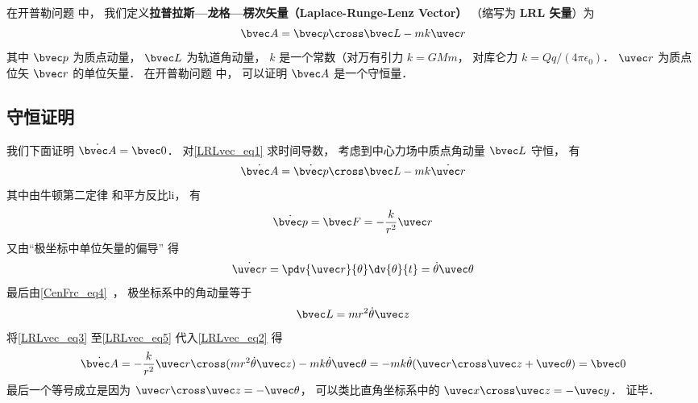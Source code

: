 

在开普勒问题%
中， 我们定义\textbf{拉普拉斯—龙格—楞次矢量（Laplace-Runge-Lenz Vector）} （缩写为 \textbf{LRL 矢量}）为
\begin{equation}\label{LRLvec_eq1}
\bvec A = \bvec p \cross \bvec L - mk \uvec r
\end{equation}
其中 $\bvec p$ 为质点动量， $\bvec L$ 为轨道角动量， $k$ 是一个常数（对万有引力 $k = GMm$， 对库仑力 $k = Qq/(4\pi\epsilon_0)$． $\uvec r$ 为质点位矢 $\bvec r$ 的单位矢量． 在开普勒问题%
中， 可以证明 $\bvec A$ 是一个守恒量．

\subsection{守恒证明}
我们下面证明 $\dot{\bvec A} = \bvec 0$． 对\autoref{LRLvec_eq1} 求时间导数， 考虑到中心力场中质点角动量 $\bvec L$ 守恒， 有
\begin{equation}\label{LRLvec_eq2}
\dot{\bvec A} = \dot{\bvec p}\cross \bvec L  - mk\dot{\uvec r}
\end{equation}
其中由牛顿第二定律 和平方反比li， 有
\begin{equation}\label{LRLvec_eq3}
\dot{\bvec p} = \bvec F = - \frac{k}{r^2}\uvec r
\end{equation}
又由“极坐标中单位矢量的偏导” 得
\begin{equation}\label{LRLvec_eq4}
\dot{\uvec r} = \pdv{\uvec r}{\theta} \dv{\theta}{t} = \dot\theta\uvec \theta
\end{equation}
最后由\autoref{CenFrc_eq4}~， 极坐标系中的角动量等于
\begin{equation}\label{LRLvec_eq5}
\bvec L = mr^2\dot \theta \uvec z
\end{equation}
将\autoref{LRLvec_eq3} 至\autoref{LRLvec_eq5} 代入\autoref{LRLvec_eq2} 得
\begin{equation}
\dot{\bvec A} = -\frac{k}{r^2}\uvec r \cross (mr^2\dot\theta\uvec z) - mk\dot\theta\uvec\theta
=-mk\dot\theta (\uvec r\cross \uvec z + \uvec \theta)
= \bvec 0
\end{equation}
最后一个等号成立是因为 $\uvec r\cross\uvec z = -\uvec\theta$， 可以类比直角坐标系中的 $\uvec x\cross\uvec z = -\uvec y$． 证毕．


